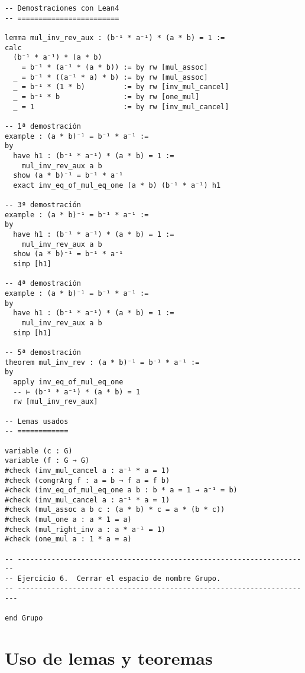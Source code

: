 \begin{verbatim}
-- Demostraciones con Lean4
-- ========================

lemma mul_inv_rev_aux : (b⁻¹ * a⁻¹) * (a * b) = 1 :=
calc
  (b⁻¹ * a⁻¹) * (a * b)
    = b⁻¹ * (a⁻¹ * (a * b)) := by rw [mul_assoc]
  _ = b⁻¹ * ((a⁻¹ * a) * b) := by rw [mul_assoc]
  _ = b⁻¹ * (1 * b)         := by rw [inv_mul_cancel]
  _ = b⁻¹ * b               := by rw [one_mul]
  _ = 1                     := by rw [inv_mul_cancel]

-- 1ª demostración
example : (a * b)⁻¹ = b⁻¹ * a⁻¹ :=
by
  have h1 : (b⁻¹ * a⁻¹) * (a * b) = 1 :=
    mul_inv_rev_aux a b
  show (a * b)⁻¹ = b⁻¹ * a⁻¹
  exact inv_eq_of_mul_eq_one (a * b) (b⁻¹ * a⁻¹) h1

-- 3ª demostración
example : (a * b)⁻¹ = b⁻¹ * a⁻¹ :=
by
  have h1 : (b⁻¹ * a⁻¹) * (a * b) = 1 :=
    mul_inv_rev_aux a b
  show (a * b)⁻¹ = b⁻¹ * a⁻¹
  simp [h1]

-- 4ª demostración
example : (a * b)⁻¹ = b⁻¹ * a⁻¹ :=
by
  have h1 : (b⁻¹ * a⁻¹) * (a * b) = 1 :=
    mul_inv_rev_aux a b
  simp [h1]

-- 5ª demostración
theorem mul_inv_rev : (a * b)⁻¹ = b⁻¹ * a⁻¹ :=
by
  apply inv_eq_of_mul_eq_one
  -- ⊢ (b⁻¹ * a⁻¹) * (a * b) = 1
  rw [mul_inv_rev_aux]

-- Lemas usados
-- ============

variable (c : G)
variable (f : G → G)
#check (inv_mul_cancel a : a⁻¹ * a = 1)
#check (congrArg f : a = b → f a = f b)
#check (inv_eq_of_mul_eq_one a b : b * a = 1 → a⁻¹ = b)
#check (inv_mul_cancel a : a⁻¹ * a = 1)
#check (mul_assoc a b c : (a * b) * c = a * (b * c))
#check (mul_one a : a * 1 = a)
#check (mul_right_inv a : a * a⁻¹ = 1)
#check (one_mul a : 1 * a = a)

-- ---------------------------------------------------------------------
-- Ejercicio 6.  Cerrar el espacio de nombre Grupo.
-- ----------------------------------------------------------------------

end Grupo
\end{verbatim}

\section{Uso de lemas y teoremas}
\label{sec:org0e27747}

